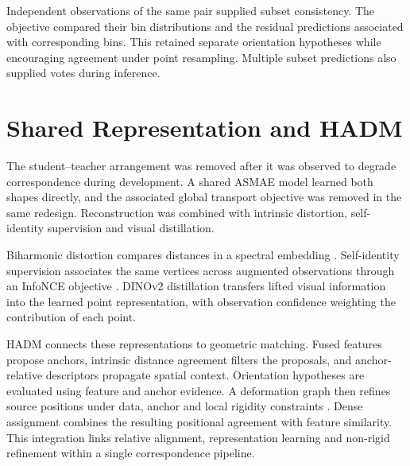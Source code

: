Independent observations of the same pair supplied subset consistency. The objective compared their bin distributions and the residual predictions associated with corresponding bins. This retained separate orientation hypotheses while encouraging agreement under point resampling. Multiple subset predictions also supplied votes during inference.

\section{Shared Representation and HADM}
\label{app:hadm}
The student--teacher arrangement was removed after it was observed to degrade correspondence during development. A shared ASMAE model learned both shapes directly, and the associated global transport objective was removed in the same redesign. Reconstruction was combined with intrinsic distortion, self-identity supervision and visual distillation.

Biharmonic distortion compares distances in a spectral embedding \citep{Lipman_2010_Biharmonic}. Self-identity supervision associates the same vertices across augmented observations through an InfoNCE objective \citep{Oord_2018_CPC}. DINOv2 distillation transfers lifted visual information into the learned point representation, with observation confidence weighting the contribution of each point.

HADM connects these representations to geometric matching. Fused features propose anchors, intrinsic distance agreement filters the proposals, and anchor-relative descriptors propagate spatial context. Orientation hypotheses are evaluated using feature and anchor evidence. A deformation graph then refines source positions under data, anchor and local rigidity constraints \citep{10.1145/1275808.1276478,sorkine2007rigid}. Dense assignment combines the resulting positional agreement with feature similarity. This integration links relative alignment, representation learning and non-rigid refinement within a single correspondence pipeline.
